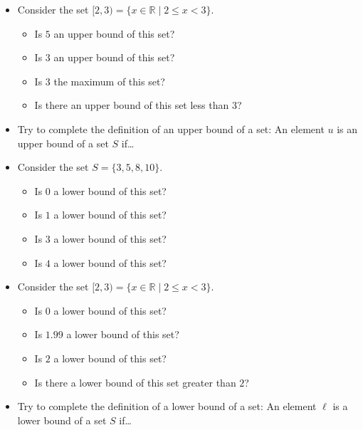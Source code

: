 \documentclass[11pt]{article}
\newenvironment{task}
	{\begin{mdframed}[linecolor=lightgray, linewidth=3pt]\raggedright}
	{\end{mdframed}}
\theoremstyle{definition}
\begin{document}
\begin{task}
\begin{itemize}
    \item Consider the set $[2,3) = \{ x \in\mathbb{R} \mid 2 \leq x < 3\}$.
        \begin{itemize}
          \item Is $5$ an upper bound of this set?
          \item Is $3$ an upper bound of this set?
          \item Is $3$ the maximum of this set?
          \item Is there an upper bound of this set less than $3$?
        \end{itemize}
      \item Try to complete the definition of an upper bound of a set: An element $u$ is an upper bound of
        a set $S$ if\dots
    \item Consider the set $S = \{ 3, 5, 8, 10\}$.
      \begin{itemize}
        \item Is $0$ a lower bound of this set?
        \item Is $1$ a lower bound of this set?
        \item Is $3$ a lower bound of this set?
        \item Is $4$ a lower bound of this set?
      \end{itemize}
    \item Consider the set $[2,3) = \{ x \in\mathbb{R} \mid 2 \leq x < 3\}$.
        \begin{itemize}
          \item Is $0$ a lower bound of this set?
          \item Is $1.99$ a lower bound of this set?
          \item Is $2$ a lower bound of this set?
          \item Is there a lower bound of this set greater than $2$?
        \end{itemize}
      \item Try to complete the definition of a lower bound of a set: An element $\ell$ is a lower bound of
        a set $S$ if\dots
  \end{itemize}
\end{task}\newpage
\end{document}
